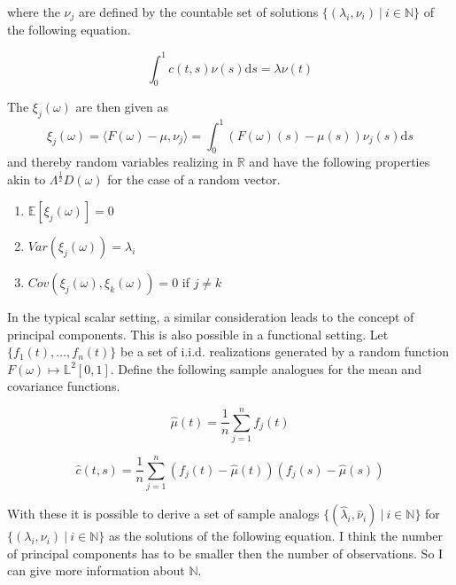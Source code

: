 \documentclass[11pt,twoside,a4paper]{article}
\begin{document}
	where the $\nu_j$ are defined by the countable set of solutions $\{(\lambda_i, \nu_i) \: \vert \: i \in \mathbb{N}\}$ of the following equation.
	
	\begin{equation}
		\int_{0}^{1}c(t,s)\nu(s) \mathrm{d}s = \lambda \nu(t)
	\end{equation}
	
	The $\xi_j(\omega)$ are then given as 
	\begin{equation}
		\xi_j(\omega) = \langle F(\omega) - \mu, \nu_j\rangle = \int_{0}^{1} \left(F(\omega)(s) - \mu(s)\right) \nu_j(s) \mathrm{d}s
	\end{equation} 
	and thereby random variables realizing in $\mathbb{R}$ and have the following properties akin to $\Lambda^{\frac{1}{2}} D(\omega)$ for the case of a random vector.
	
	\begin{multicols}{2}
		\begin{enumerate}
			\item $\mathbb{E}\left[\xi_j(\omega)\right] = 0$
			\item $Var\left(\xi_j(\omega)\right) = \lambda_i$
			\item $Cov\left(\xi_j(\omega), \xi_k(\omega)\right) = 0$ if $j \neq k$
		\end{enumerate}
	\end{multicols}
	
	In the typical scalar setting, a similar consideration leads to the concept of principal components. This is also possible in a functional setting. Let $\{f_1(t), \dots, f_n(t)\}$ be a set of i.i.d. realizations generated by a random function $F(\omega) \mapsto \mathbb{L}^2[0,1]$.
	Define the following sample analogues for the mean and covariance functions.
	
	\begin{equation}
		\hat{\mu}(t) = \frac{1}{n}\sum_{j = 1}^{n}f_j(t)
	\end{equation}

	\begin{equation}
		\hat{c}(t,s) = \frac{1}{n} \sum_{j = 1}^{n} \left(f_j(t) - \hat{\mu}(t)\right) \left(f_j(s) - \hat{\mu}(s)\right)
	\end{equation}

	With these it is possible to derive a set of sample analogs $\{(\hat{\lambda}_i, \hat{\nu}_i) \: \vert \: i \in \mathbb{N}\}$ for $\{(\lambda_i, \nu_i) \: \vert \: i \in \mathbb{N}\}$ as the solutions of the following equation. {\color{red} I think the number of principal components has to be smaller then the number of observations. So I can give more information about $\mathbb{N}$.}
	
\end{document}
